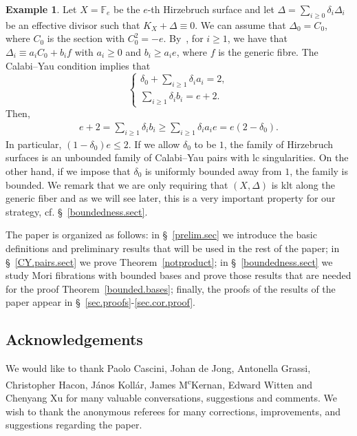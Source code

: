 \documentclass{amsart}[12pt,a4paper]
\theoremstyle{definition}
\newtheorem{example}[theorem]{Example}
\begin{document}
\begin{example}
\label{hirzebruch}
Let $X=\mathbb{F}_e$ be the $e$-th Hirzebruch surface and let $\Delta=\sum_{i\geq 0} \delta_i \Delta_i$ be an effective divisor such that $K_X+\Delta \equiv 0$. 
We can assume that $\Delta_0= C_0$, where $C_0$ is the section with $C_0^2 = -e$. 
By~\cite[Proposition~V.2.20]{Har}, for $i\geq 1$, we have that $\Delta_i \equiv a_i C_0 + b_i f$ with $a_i \geq 0$ and $b_i \geq a_i e$, where $f$ is the generic fibre. 
The Calabi--Yau condition implies that
	\[
		\begin{cases}
			\delta_{0}+\sum_{i\geq 1}\delta_{i}a_{i}=2, \\
			\sum_{i\geq 1}\delta_{i}b_{i}=e+2.
		\end{cases}
	\]
Then, 
\begin{align*}
e+2=\sum_{i\geq 1}\delta_{i}b_{i}\geq \sum_{i\geq 1}\delta_{i}a_{i}e=e(2-\delta_{0}).
\end{align*}
In particular, $(1-\delta_0)e\leq 2$. If we allow $\delta_0$ to be $1$, the family of Hirzebruch surfaces is an unbounded family of Calabi--Yau pairs with lc singularities. 
On the other hand, if we impose that $\delta_0$ is uniformly bounded away from $1$, the family is bounded. 
We remark that we are only requiring that $(X,\Delta)$ is klt along the generic fiber and as we will see later, this is a very important property for our strategy, cf. \S~\ref{boundedness.sect}. 
\end{example}

The paper is organized as follows: 
in \S~\ref{prelim.sec} we introduce the basic definitions and preliminary results that will be used in the rest of the paper;
in \S~\ref{CY.pairs.sect} we prove Theorem~\ref{notproduct};
in \S~\ref{boundedness.sect} we study Mori fibrations with bounded bases and prove those results that are needed for the proof Theorem~\ref{bounded.bases};
finally, the proofs of the results of the paper appear in \S~\ref{sec.proofs}-\ref{sec.cor.proof}.



\subsection*{Acknowledgements}
We would like to thank Paolo Cascini, Johan de Jong, Antonella Grassi, Christopher Hacon, J\'anos Koll\'ar, James M\textsuperscript{c}Kernan, Edward Witten and Chenyang Xu for many valuable conversations, suggestions and comments.
We wish to thank the anonymous referees for many corrections, improvements, and suggestions regarding the paper.
\end{document}
